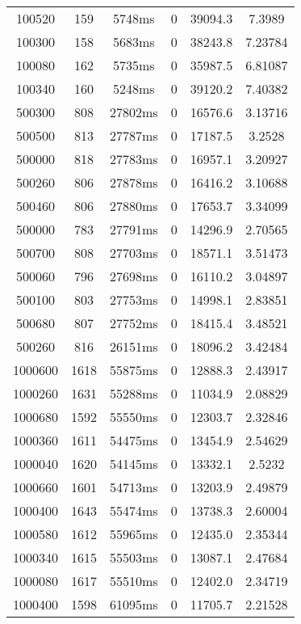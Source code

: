 \documentclass[./main.tex]{subfiles}
\begin{document}
\begin{table}
\begin{tabular}{ c | c | c | c | c | c }
        100520 & 159 & 5748ms & 0 & 39094.3 & 7.3989 \\
        100300 & 158 & 5683ms & 0 & 38243.8 & 7.23784 \\
        100080 & 162 & 5735ms & 0 & 35987.5 & 6.81087 \\
        100340 & 160 & 5248ms & 0 & 39120.2 & 7.40382 \\
        \hline
        500300 & 808 & 27802ms & 0 & 16576.6 & 3.13716 \\
        500500 & 813 & 27787ms & 0 & 17187.5 & 3.2528 \\
        \rowcolor{lightgray} 500000 & 818 & 27783ms & 0 & 16957.1 & 3.20927 \\
        500260 & 806 & 27878ms & 0 & 16416.2 & 3.10688 \\
        500460 & 806 & 27880ms & 0 & 17653.7 & 3.34099 \\
        500000 & 783 & 27791ms & 0 & 14296.9 & 2.70565 \\
        500700 & 808 & 27703ms & 0 & 18571.1 & 3.51473 \\
        500060 & 796 & 27698ms & 0 & 16110.2 & 3.04897 \\
        500100 & 803 & 27753ms & 0 & 14998.1 & 2.83851 \\
        500680 & 807 & 27752ms & 0 & 18415.4 & 3.48521 \\
        500260 & 816 & 26151ms & 0 & 18096.2 & 3.42484 \\
        \hline
        \rowcolor{lightgray} 1000600 & 1618 & 55875ms & 0 & 12888.3 & 2.43917 \\
        1000260 & 1631 & 55288ms & 0 & 11034.9 & 2.08829 \\
        1000680 & 1592 & 55550ms & 0 & 12303.7 & 2.32846 \\
        1000360 & 1611 & 54475ms & 0 & 13454.9 & 2.54629 \\
        1000040 & 1620 & 54145ms & 0 & 13332.1 & 2.5232 \\
        1000660 & 1601 & 54713ms & 0 & 13203.9 & 2.49879 \\
        1000400 & 1643 & 55474ms & 0 & 13738.3 & 2.60004 \\
        1000580 & 1612 & 55965ms & 0 & 12435.0 & 2.35344 \\
        1000340 & 1615 & 55503ms & 0 & 13087.1 & 2.47684 \\
        1000080 & 1617 & 55510ms & 0 & 12402.0 & 2.34719 \\
        1000400 & 1598 & 61095ms & 0 & 11705.7 & 2.21528 \\

\end{tabular}
\end{table}
\end{document}
